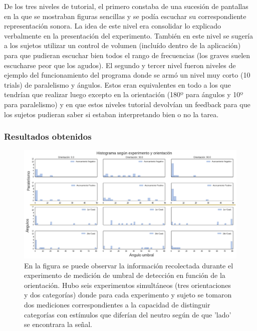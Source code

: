 \documentclass{article}
\numberwithin{figure}{section}
\begin{document}
    De los tres niveles de tutorial, el primero constaba de una sucesión de pantallas en la que se mostraban figuras sencillas y se podía escuchar su correspondiente representación sonora. La idea de este nivel era consolidar lo explicado verbalmente en la presentación del experimento. También en este nivel se sugería a los sujetos utilizar un control de volumen (incluído dentro de la aplicación) para que pudieran escuchar bien todos el rango de frecuencias (los graves suelen escucharse peor que los agudos). El segundo y tercer nivel fueron niveles de ejemplo del funcionamiento del programa donde se armó un nivel muy corto (10 trials) de paralelismo y ángulos. Estos eran equivalentes en todo a los que tendrían que realizar luego excepto en la orientación (180º para ángulos y 10º para paralelismo) y en que estos niveles tutorial devolvían un feedback para que los sujetos pudieran saber si estaban interpretando bien o no la tarea. 
    
    \subsubsection{Resultados obtenidos}
    
    \begin{figure}
        \center
        \includegraphics[width=\textwidth]{Imagenes/Exp1_DataCruda.png}
        \caption{En la figura se puede observar la información recolectada durante el experimento de medición de umbral de detección en función de la orientación. Hubo seis experimentos simultáneos (tres orientaciones y dos categorías) donde para cada experimento y sujeto se tomaron dos mediciones correspondientes a la capacidad de distinguir categorías con estímulos que diferían del neutro según de que 'lado' se encontrara la señal.}
        \label{fig:Exp1DataCruda}
    \end{figure}  
    
\end{document}
